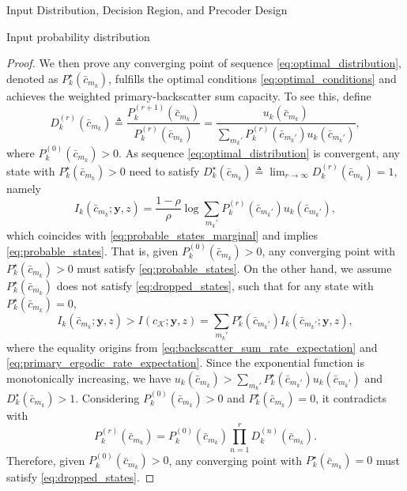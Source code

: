 \documentclass[journal]{IEEEtran}
\begin{document}
\begin{section}{Input Distribution, Decision Region, and Precoder Design}
\begin{subsection}{Input probability distribution}
\begin{proof}
				We then prove any converging point of sequence \eqref{eq:optimal_distribution}, denoted as $P_k^{\star}(\bar{c}_{m_k})$, fulfills the optimal conditions \eqref{eq:optimal_conditions} and achieves the weighted primary-backscatter sum capacity. To see this, define
				\begin{equation}
					D_k^{(r)}(\bar{c}_{m_k}) \triangleq \frac{P_k^{(r+1)}(\bar{c}_{m_k})}{P_k^{(r)}(\bar{c}_{m_k})} = \frac{u_k(\bar{c}_{m_k})}{\sum_{m_k'} P_k^{(r)}(\bar{c}_{m_k'}) u_k(\bar{c}_{m_k'})},
				\end{equation}
				where $P_k^{(0)}(\bar{c}_{m_k}) > 0$. As sequence \eqref{eq:optimal_distribution} is convergent, any state with $P_k^{\star}(\bar{c}_{m_k}) > 0$ need to satisfy $D_k^{\star}(\bar{c}_{m_k}) \triangleq \lim_{r \to \infty} D_k^{(r)}(\bar{c}_{m_k}) = 1$, namely
				\begin{equation}
					I_k(\bar{c}_{m_k};\boldsymbol{y},z) = \frac{1 - \rho}{\rho} \log \sum_{m_k'} P_k^{(r)}(\bar{c}_{m_k'}) u_k(\bar{c}_{m_k'}),
				\end{equation}
				which coincides with \eqref{eq:probable_states_marginal} and implies \eqref{eq:probable_states}. That is, given $P_k^{(0)}(\bar{c}_{m_k}) > 0$, any converging point with $P_k^{\star}(\bar{c}_{m_k}) > 0$ must satisfy \eqref{eq:probable_states}.
				On the other hand, we assume $P_k^{\star}(\bar{c}_{m_k})$ does not satisfy \eqref{eq:dropped_states}, such that for any state with $P_k^{\star}(\bar{c}_{m_k}) = 0$,
				\begin{equation}
					I_k(\bar{c}_{m_k};\boldsymbol{y},z) > I(c_{\mathcal{K}};\boldsymbol{y},z) = \sum_{m_k'} P_k^{\star}(\bar{c}_{m_k'}) I_k(\bar{c}_{m_k'};\boldsymbol{y},z),
				\end{equation}
				where the equality origins from \eqref{eq:backscatter_sum_rate_expectation} and \eqref{eq:primary_ergodic_rate_expectation}. Since the exponential function is monotonically increasing, we have $u_k(\bar{c}_{m_k}) > \sum_{m_k'} P_k^{\star}(\bar{c}_{m_k'}) u_k(\bar{c}_{m_k'})$ and $D_k^{\star}(\bar{c}_{m_k}) > 1$. Considering $P_k^{(0)}(\bar{c}_{m_k}) > 0$ and $P_k^{\star}(\bar{c}_{m_k}) = 0$, it contradicts with
				\begin{equation}
					P_k^{(r)}(\bar{c}_{m_k}) = P_k^{(0)}(\bar{c}_{m_k}) \prod_{n=1}^r D_k^{(n)}(\bar{c}_{m_k}).
				\end{equation}
				Therefore, given $P_k^{(0)}(\bar{c}_{m_k}) > 0$, any converging point with $P_k^{\star}(\bar{c}_{m_k}) = 0$ must satisfy \eqref{eq:dropped_states}.


\end{proof}
\end{subsection}
\end{section}
\end{document}
